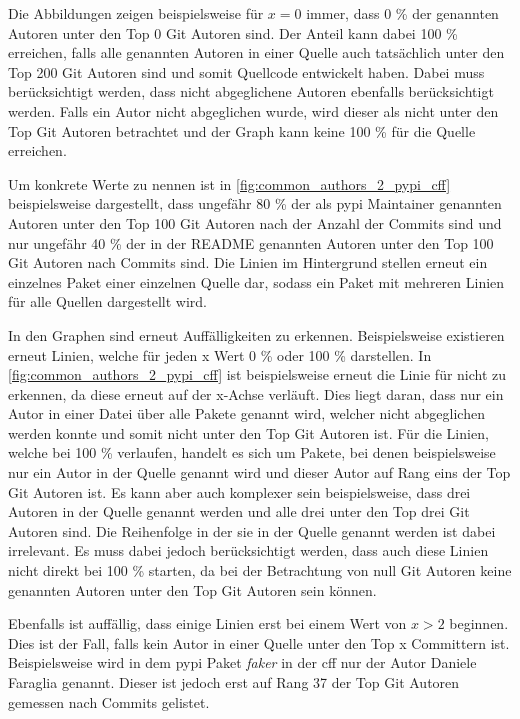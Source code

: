 Die Abbildungen zeigen beispielsweise für $x=0$ immer, dass 0 \% der genannten Autoren unter den Top 0 Git Autoren sind.
Der Anteil kann dabei 100 \% erreichen, falls alle genannten Autoren in einer Quelle auch tatsächlich unter den Top 200 Git Autoren sind und somit Quellcode entwickelt haben.
Dabei muss berücksichtigt werden, dass nicht abgeglichene Autoren ebenfalls berücksichtigt werden.
Falls ein Autor nicht abgeglichen wurde, wird dieser als nicht unter den Top Git Autoren betrachtet und der Graph kann keine 100 \% für die Quelle erreichen.

Um konkrete Werte zu nennen ist in \autoref{fig:common_authors_2_pypi_cff} beispielsweise dargestellt, dass ungefähr 80 \% der als \gls{pypi} Maintainer genannten Autoren unter den Top 100 Git Autoren nach der Anzahl der Commits sind und nur ungefähr 40 \% der in der README genannten Autoren unter den Top 100 Git Autoren nach Commits sind.
Die Linien im Hintergrund stellen erneut ein einzelnes Paket einer einzelnen Quelle dar, sodass ein Paket mit mehreren Linien für alle Quellen dargestellt wird.

In den Graphen sind erneut Auffälligkeiten zu erkennen.
Beispielsweise existieren erneut Linien, welche für jeden x Wert 0 \% oder 100 \% darstellen.
In \autoref{fig:common_authors_2_pypi_cff} ist beispielsweise erneut die Linie für  nicht zu erkennen, da diese erneut auf der x-Achse verläuft.
Dies liegt daran, dass nur ein Autor in einer  Datei über alle Pakete genannt wird, welcher nicht abgeglichen werden konnte und somit nicht unter den Top Git Autoren ist.
Für die Linien, welche bei 100 \% verlaufen, handelt es sich um Pakete, bei denen beispielsweise nur ein Autor in der Quelle genannt wird und dieser Autor auf Rang eins der Top Git Autoren ist.
Es kann aber auch komplexer sein beispielsweise, dass drei Autoren in der Quelle genannt werden und alle drei unter den Top drei Git Autoren sind.
Die Reihenfolge in der sie in der Quelle genannt werden ist dabei irrelevant.
Es muss dabei jedoch berücksichtigt werden, dass auch diese Linien nicht direkt bei 100 \% starten, da bei der Betrachtung von null Git Autoren keine genannten Autoren unter den Top Git Autoren sein können.

Ebenfalls ist auffällig, dass einige Linien erst bei einem Wert von $x>2$ beginnen.
Dies ist der Fall, falls kein Autor in einer Quelle unter den Top x Committern ist.
Beispielsweise wird in dem \gls{pypi} Paket \emph{faker} in der \gls{cff} nur der Autor \glqq Daniele Faraglia\grqq{} genannt.
Dieser ist jedoch erst auf Rang 37 der Top Git Autoren gemessen nach Commits gelistet.

